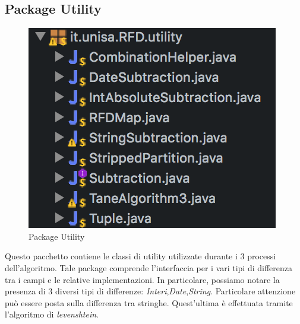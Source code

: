 \subsection{Package Utility}
\begin{figure}[H]
	\centering
	\includegraphics{Immagini/PackageUtility.png}
	\caption{Package Utility}
	\label{fig:Package Utility}
\end{figure}
Questo pacchetto contiene le classi di utility utilizzate durante i 3 processi dell'algoritmo.
Tale package comprende l'interfaccia per i vari tipi di differenza tra i campi e le relative implementazioni.
In particolare, possiamo notare la presenza di 3 diversi tipi di differenze: \emph{Interi},\emph{Date},\emph{String}. Particolare attenzione può essere posta sulla differenza tra stringhe. Quest'ultima è effettuata tramite l'algoritmo di \emph{levenshtein}.